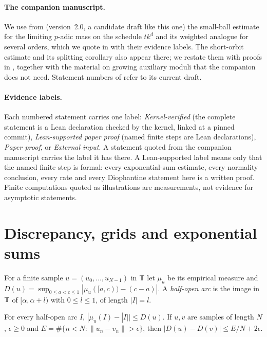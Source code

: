 \documentclass[11pt]{article}
\newcommand{\dist}[1]{\lVert #1\rVert}
\begin{document}
\paragraph{The companion manuscript.} We use from \cite{PaperVIIv2} (version~2.0, a candidate draft like this one)
the small-ball estimate for the limiting $p$-adic mass on the schedule $tk^d$ and its weighted analogue for several
orders, which we quote in  with their evidence labels. The short-orbit estimate and its splitting
corollary also appear there; we restate them with proofs in , together with the material on
growing auxiliary moduli that the companion does not need. Statement numbers of \cite{PaperVIIv2} refer to its
current draft.

\paragraph{Evidence labels.} Each numbered statement carries one label: \emph{Kernel-verified} (the complete
statement is a Lean declaration checked by the kernel, linked at a pinned commit), \emph{Lean-supported paper
proof} (named finite steps are Lean declarations), \emph{Paper proof}, or \emph{External input}. A statement quoted
from the companion manuscript carries the label it has there. A Lean-supported label means only that the named
finite step is formal: every exponential-sum estimate, every normality conclusion, every rate and every
Diophantine statement here is a written proof. Finite computations quoted as illustrations are measurements, not
evidence for asymptotic statements.

\section{Discrepancy, grids and exponential sums}\label{sec:prelim}

For a finite sample $u=(u_0,\ldots,u_{N-1})$ in $\mathbb T$ let $\mu_u$ be its empirical measure and
$D(u)=\sup_{0\le a<c\le1}|\mu_u([a,c))-(c-a)|$. A \emph{half-open arc} is the image in $\mathbb T$ of $[\alpha,\alpha+l)$ with
$0\le l\le1$, of length $|I|=l$.

\begin{lemma}\label{lem:compare}
For every half-open arc $I$, $|\mu_u(I)-|I||\le D(u)$. If $u,v$ are samples of length $N$, $\epsilon\ge0$ and
$E=\#\{n<N:\dist{u_n-v_n}>\epsilon\}$, then $|D(u)-D(v)|\le E/N+2\epsilon$.
\end{lemma}
\end{document}
